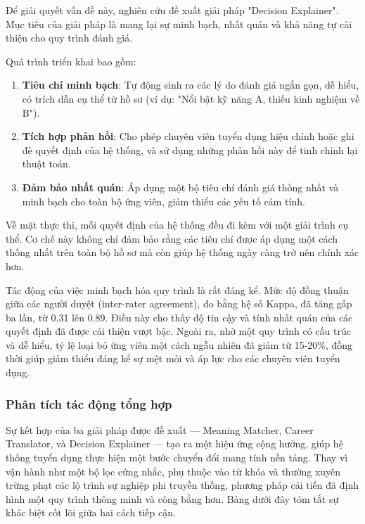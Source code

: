 \documentclass{article}
\begin{document}
Để giải quyết vấn đề này, nghiên cứu đề xuất giải pháp "Decision Explainer". Mục tiêu của giải pháp là mang lại sự minh bạch, nhất quán và khả năng tự cải thiện cho quy trình đánh giá.

Quá trình triển khai bao gồm:
\begin{enumerate}[topsep=0pt, itemsep=0pt, leftmargin=40pt, label=\arabic*.]
    \item \textbf{Tiêu chí minh bạch}: Tự động sinh ra các lý do đánh giá ngắn gọn, dễ hiểu, có trích dẫn cụ thể từ hồ sơ (ví dụ: "Nổi bật kỹ năng A, thiếu kinh nghiệm về B").
    \item \textbf{Tích hợp phản hồi}: Cho phép chuyên viên tuyển dụng hiệu chỉnh hoặc ghi đè quyết định của hệ thống, và sử dụng những phản hồi này để tinh chỉnh lại thuật toán.
    \item \textbf{Đảm bảo nhất quán}: Áp dụng một bộ tiêu chí đánh giá thống nhất và minh bạch cho toàn bộ ứng viên, giảm thiểu các yếu tố cảm tính.
\end{enumerate}

Về mặt thực thi, mỗi quyết định của hệ thống đều đi kèm với một giải trình cụ thể. Cơ chế này không chỉ đảm bảo rằng các tiêu chí được áp dụng một cách thống nhất trên toàn bộ hồ sơ mà còn giúp hệ thống ngày càng trở nên chính xác hơn.

Tác động của việc minh bạch hóa quy trình là rất đáng kể. Mức độ đồng thuận giữa các người duyệt (inter-rater agreement), đo bằng hệ số Kappa, đã tăng gấp ba lần, từ 0.31 lên 0.89. Điều này cho thấy độ tin cậy và tính nhất quán của các quyết định đã được cải thiện vượt bậc. Ngoài ra, nhờ một quy trình có cấu trúc và dễ hiểu, tỷ lệ loại bỏ ứng viên một cách ngẫu nhiên đã giảm từ 15-20\%, đồng thời giúp giảm thiểu đáng kể sự mệt mỏi và áp lực cho các chuyên viên tuyển dụng.

\subsubsection{Phân tích tác động tổng hợp}

Sự kết hợp của ba giải pháp được đề xuất — Meaning Matcher, Career Translator, và Decision Explainer — tạo ra một hiệu ứng cộng hưởng, giúp hệ thống tuyển dụng thực hiện một bước chuyển đổi mang tính nền tảng. Thay vì vận hành như một bộ lọc cứng nhắc, phụ thuộc vào từ khóa và thường xuyên trừng phạt các lộ trình sự nghiệp phi truyền thống, phương pháp cải tiến đã định hình một quy trình thông minh và công bằng hơn. Bảng dưới đây tóm tắt sự khác biệt cốt lõi giữa hai cách tiếp cận.
\end{document}
